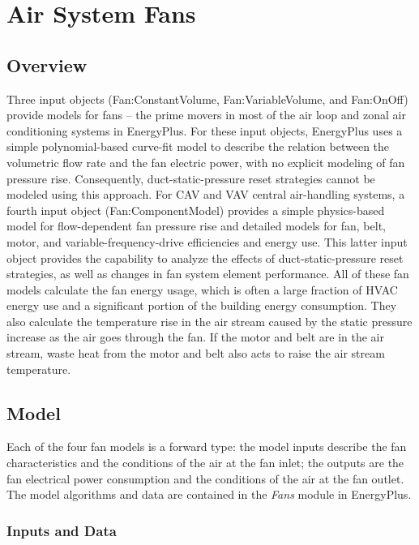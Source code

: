 \section{Air System Fans }\label{air-system-fans}

\subsection{Overview}\label{overview-002}

Three input objects (Fan:ConstantVolume, Fan:VariableVolume, and Fan:OnOff) provide models for fans -- the prime movers in most of the air loop and zonal air conditioning systems in EnergyPlus. For these input objects, EnergyPlus uses a simple polynomial-based curve-fit model to describe the relation between the volumetric flow rate and the fan electric power, with no explicit modeling of fan pressure rise. Consequently, duct-static-pressure reset strategies cannot be modeled using this approach. For CAV and VAV central air-handling systems, a fourth input object (Fan:ComponentModel) provides a simple physics-based model for flow-dependent fan pressure rise and detailed models for fan, belt, motor, and variable-frequency-drive efficiencies and energy use. This latter input object provides the capability to analyze the effects of duct-static-pressure reset strategies, as well as changes in fan system element performance. All of these fan models calculate the fan energy usage, which is often a large fraction of HVAC energy use and a significant portion of the building energy consumption. They also calculate the temperature rise in the air stream caused by the static pressure increase as the air goes through the fan. If the motor and belt are in the air stream, waste heat from the motor and belt also acts to raise the air stream temperature.

\subsection{Model}\label{model-000}

Each of the four fan models is a forward type: the model inputs describe the fan characteristics and the conditions of the air at the fan inlet; the outputs are the fan electrical power consumption and the conditions of the air at the fan outlet. The model algorithms and data are contained in the \emph{Fans} module in EnergyPlus.

\subsubsection{Inputs and Data}\label{inputs-and-data-000}

